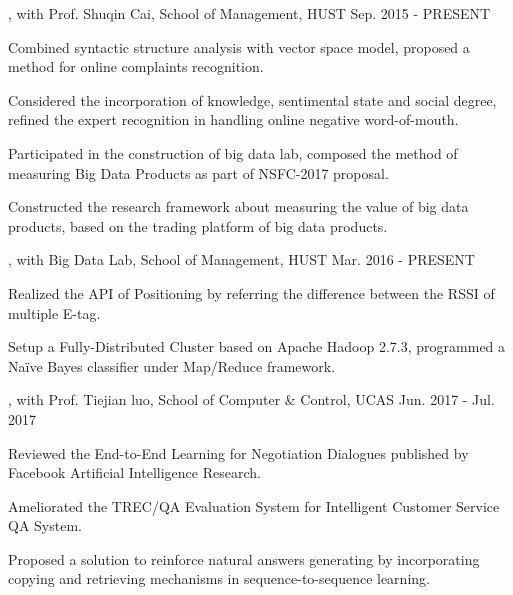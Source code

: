 \vspace{-2.0mm}

\begin{cventries}
\vspace{-1.5mm}

\cvexperience
{, with Prof. Shuqin Cai, School of Management, HUST}
{Sep. 2015 - PRESENT}
{
    \begin{cvitems}
    \item {Combined syntactic structure analysis with vector space model, proposed a method for online complaints recognition.}
    \item {Considered the incorporation of knowledge, sentimental state and social degree, refined the expert recognition in handling online negative word-of-mouth.}
    \item {Participated in the construction of big data lab, composed the method of measuring Big Data Products as part of NSFC-2017 proposal.}
    \item {Constructed the research framework about measuring the value of big data products, based on the trading platform of big data products.}
    \end{cvitems}
}

\cvexperience
{, with Big Data Lab, School of Management, HUST}
{Mar. 2016 - PRESENT}
{
    \begin{cvitems}
    \item {Realized the API of Positioning by referring the difference between the RSSI of multiple E-tag.}
    \item {Setup a Fully-Distributed Cluster based on Apache Hadoop 2.7.3, programmed a Naïve Bayes classifier under Map/Reduce framework.}
    \end{cvitems}
}

\cvexperience
{, with Prof. Tiejian luo, School of Computer \& Control, UCAS}
{Jun. 2017 - Jul. 2017}
{
    \begin{cvitems}
    \item {Reviewed the End-to-End Learning for Negotiation Dialogues published by Facebook Artificial Intelligence Research.}
    \item {Ameliorated the TREC/QA Evaluation System for Intelligent Customer Service QA System.}
    \item {Proposed a solution to reinforce natural answers generating by incorporating copying and retrieving mechanisms in sequence-to-sequence learning.}
    \end{cvitems}
}


\end{cventries}
